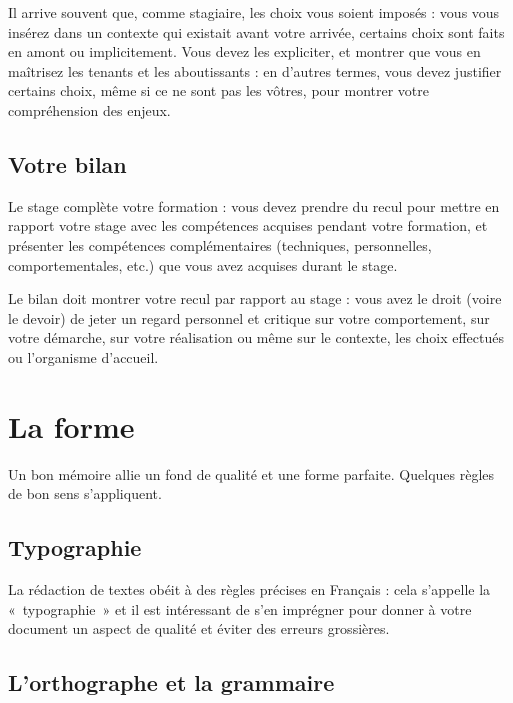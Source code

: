 \documentclass [twoside,openright,a4paper,11pt,french] {report}
\begin{document}
Il arrive souvent que, comme stagiaire, les choix vous soient imposés :
vous vous insérez dans un contexte qui existait avant votre arrivée,
certains choix sont faits en amont ou implicitement. Vous devez
les expliciter, et montrer que vous en maîtrisez les tenants et les
aboutissants : en d'autres termes, vous devez justifier certains choix,
même si ce ne sont pas les vôtres, pour montrer votre compréhension
des enjeux.

\section {Votre bilan}

Le stage complète votre formation : vous devez prendre du recul pour
mettre en rapport votre stage avec les compétences acquises pendant votre
formation, et présenter les compétences complémentaires (techniques,
personnelles, comportementales, etc.) que vous avez acquises durant
le stage.

Le bilan doit montrer votre recul par rapport au stage : vous avez le
droit (voire le devoir) de jeter un regard personnel et critique sur
votre comportement, sur votre démarche, sur votre réalisation ou même
sur le contexte, les choix effectués ou l'organisme d'accueil.



\chapter {La forme}
    \label {chap:contexte}

Un bon mémoire allie un fond de qualité et une forme parfaite. Quelques
règles de bon sens s'appliquent.

\section {Typographie}

La rédaction de textes obéit à des règles précises en
Français : cela s'appelle la «~typographie~» \cite{andre1990} et il
est intéressant de s'en imprégner pour donner à votre document un
aspect de qualité et éviter des erreurs grossières.

\section {L'orthographe et la grammaire}
\end{document}
